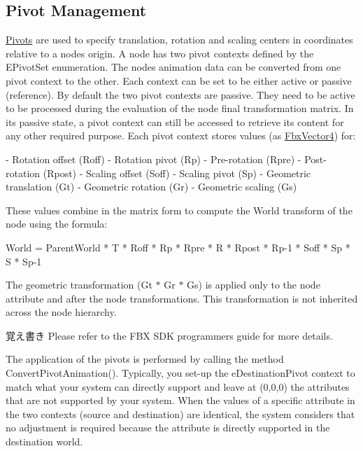 \subsection*{Pivot Management}
\label{_amgrp952cff0f294966fdcb9a32a14724d5aa}%
\hyperlink{class_fbx_node_1_1_pivots}{Pivots} are used to specify translation, rotation and scaling centers in coordinates relative to a node\textquotesingle{}s origin. A node has two pivot contexts defined by the E\+Pivot\+Set enumeration. The node\textquotesingle{}s animation data can be converted from one pivot context to the other. Each context can be set to be either active or passive (reference). By default the two pivot contexts are passive. They need to be active to be processed during the evaluation of the node final transformation matrix. In its passive state, a pivot context can still be accessed to retrieve its content for any other required purpose. Each pivot context stores values (as \hyperlink{class_fbx_vector4}{Fbx\+Vector4}) for\+: 
\begin{DoxyCode}
    - Rotation offset (Roff)
    - Rotation pivot (Rp)
    - Pre-rotation (Rpre)
    - Post-rotation (Rpost)
    - Scaling offset (Soff)
    - Scaling pivot (Sp)
    - Geometric translation (Gt)
    - Geometric rotation (Gr)
    - Geometric scaling (Gs)

These values combine in the matrix form to compute the World transform of the node 
\textcolor{keyword}{using} the formula:

    World = ParentWorld * T * Roff * Rp * Rpre * R * Rpost * Rp-1 * Soff * Sp * S * Sp-1
\end{DoxyCode}


The geometric transformation (Gt $\ast$ Gr $\ast$ Gs) is applied only to the node attribute and after the node transformations. This transformation is not inherited across the node hierarchy.

\begin{DoxyNote}{覚え書き}
Please refer to the F\+BX S\+DK programmers guide for more details.
\end{DoxyNote}
The application of the pivots is performed by calling the method Convert\+Pivot\+Animation(). Typically, you set-\/up the e\+Destination\+Pivot context to match what your system can directly support and leave at (0,0,0) the attributes that are not supported by your system. When the values of a specific attribute in the two contexts (source and destination) are identical, the system considers that no adjustment is required because the attribute is directly supported in the destination world.

